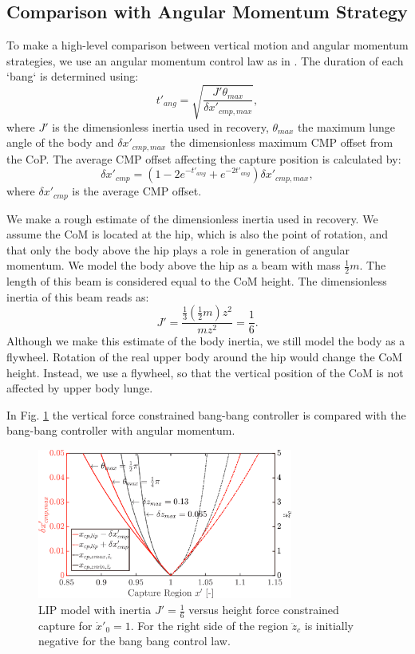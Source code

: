 \documentclass[letterpaper, 10 pt, conference]{ieeeconf}  %
\begin{document}
\subsection{Comparison with Angular Momentum Strategy}
To make a high-level comparison between vertical motion and angular momentum strategies, we use an angular momentum control law as in \cite{pratt2006capture,stephens2007humanoid,koolen2012capturability}. The duration of each `bang` is determined using:
\begin{equation}	
	t'_{ang} = \sqrt{\frac{J'\theta_{max}}{\delta x'_{cmp,max}}},
\end{equation}
where $J'$ is the dimensionless inertia used in recovery, $\theta_{max}$ the maximum lunge angle of the body and $\delta x'_{cmp,max}$ the dimensionless maximum CMP offset from the CoP. The average CMP offset affecting the capture position is calculated by:
\begin{equation}
 \delta x'_{cmp} = (1 -2e^{-t'_{ang}}+e^{-2t'_{ang}})\delta x'_{cmp,max},
\end{equation}
where $\delta x'_{cmp}$ is the average CMP offset.

We make a rough estimate of the dimensionless inertia used in recovery. We assume the CoM is located at the hip, which is also the point of rotation, and that only the body above the hip plays a role in generation of angular momentum. We model the body above the hip as a beam with mass $\frac{1}{2}m$. The length of this beam is considered equal to the CoM height. The dimensionless inertia of this beam reads as:
\begin{equation}
	J' = \frac{\frac{1}{3}(\frac{1}{2}m)z^2}{mz^2} = \frac{1}{6}.
\end{equation}
Although we make this estimate of the body inertia, we still model the body as a flywheel. Rotation of the real upper body around the hip would change the CoM height. Instead, we use a flywheel, so that the vertical position of the CoM is not affected by upper body lunge.

In Fig. \ref{fig:compare} the vertical force constrained bang-bang controller is compared with the bang-bang controller with angular momentum.

\begin{figure}
      \centering
      \includegraphics[width=3.3in]{capcompare.png}
      \caption{LIP model with inertia $J'=\frac{1}{6}$ versus height force constrained capture for $\dot{x}'_0=1$. For the right side of the region $\ddot{z}_c$ is initially negative for the bang bang control law.}
      \label{fig:compare}
\end{figure}
\end{document}

